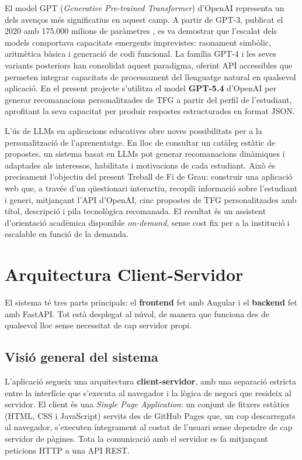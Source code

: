 \documentclass[12pt,a4paper]{article}
\begin{document}
El model GPT (\textit{Generative Pre-trained Transformer}) d'OpenAI representa un dels avenços més significatius en aquest camp. A partir de GPT-3, publicat el 2020 amb 175.000 milions de paràmetres \cite{brown2020gpt3}, es va demostrar que l'escalat dels models comportava capacitats emergents imprevistes: raonament simbòlic, aritmètica bàsica i generació de codi funcional. La família GPT-4 i les seves variants posteriors han consolidat aquest paradigma, oferint API accessibles \cite{openai2024api} que permeten integrar capacitats de processament del llenguatge natural en qualsevol aplicació. En el present projecte s'utilitza el model \textbf{GPT-5.4} d'OpenAI per generar recomanacions personalitzades de TFG a partir del perfil de l'estudiant, aprofitant la seva capacitat per produir respostes estructurades en format JSON.

L'ús de LLMs en aplicacions educatives obre noves possibilitats per a la personalització de l'aprenentatge. En lloc de consultar un catàleg estàtic de propostes, un sistema basat en LLMs pot generar recomanacions dinàmiques i adaptades als interessos, habilitats i motivacions de cada estudiant. Això és precisament l'objectiu del present Treball de Fi de Grau: construir una aplicació web que, a través d'un qüestionari interactiu, recopili informació sobre l'estudiant i generi, mitjançant l'API d'OpenAI, cinc propostes de TFG personalitzades amb títol, descripció i pila tecnològica recomanada. El resultat és un assistent d'orientació acadèmica disponible \textit{on-demand}, sense cost fix per a la institució i escalable en funció de la demanda.

\section{Arquitectura Client-Servidor}

El sistema té tres parts principals: el \textbf{frontend} fet amb Angular i el \textbf{backend} fet amb FastAPI. Tot està desplegat al núvol, de manera que funciona des de qualsevol lloc sense necessitat de cap servidor propi.

\subsection{Visió general del sistema}

L'aplicació segueix una arquitectura \textbf{client-servidor}, amb una separació estricta entre la interfície que s'executa al navegador i la lògica de negoci que resideix al servidor. El client és una \textit{Single Page Application}: un conjunt de fitxers estàtics (HTML, CSS i JavaScript) servits des de GitHub Pages que, un cop descarregats al navegador, s'executen íntegrament al costat de l'usuari sense dependre de cap servidor de pàgines. Tota la comunicació amb el servidor es fa mitjançant peticions HTTP a una API REST.
\end{document}
